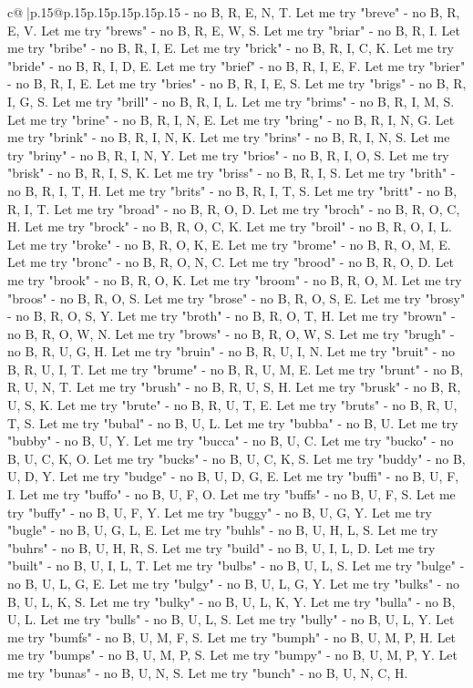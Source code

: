 \documentclass{article}
\begin{document}
{\begin{supertabular}{c@{$\;$}|p{.15\linewidth}@{}p{.15\linewidth}p{.15\linewidth}p{.15\linewidth}p{.15\linewidth}p{.15\linewidth}}
{{{{-} no B, R, E, N, T. Let me try "breve" {-} no B, R, E, V. Let me try "brews" {-} no B, R, E, W, S. Let me try "briar" {-} no B, R, I. Let me try "bribe" {-} no B, R, I, E. Let me try "brick" {-} no B, R, I, C, K. Let me try "bride" {-} no B, R, I, D, E. Let me try "brief" {-} no B, R, I, E, F. Let me try "brier" {-} no B, R, I, E. Let me try "bries" {-} no B, R, I, E, S. Let me try "brigs" {-} no B, R, I, G, S. Let me try "brill" {-} no B, R, I, L. Let me try "brims" {-} no B, R, I, M, S. Let me try "brine" {-} no B, R, I, N, E. Let me try "bring" {-} no B, R, I, N, G. Let me try "brink" {-} no B, R, I, N, K. Let me try "brins" {-} no B, R, I, N, S. Let me try "briny" {-} no B, R, I, N, Y. Let me try "brios" {-} no B, R, I, O, S. Let me try "brisk" {-} no B, R, I, S, K. Let me try "briss" {-} no B, R, I, S. Let me try "brith" {-} no B, R, I, T, H. Let me try "brits" {-} no B, R, I, T, S. Let me try "britt" {-} no B, R, I, T. Let me try "broad" {-} no B, R, O, D. Let me try "broch" {-} no B, R, O, C, H. Let me try "brock" {-} no B, R, O, C, K. Let me try "broil" {-} no B, R, O, I, L. Let me try "broke" {-} no B, R, O, K, E. Let me try "brome" {-} no B, R, O, M, E. Let me try "bronc" {-} no B, R, O, N, C. Let me try "brood" {-} no B, R, O, D. Let me try "brook" {-} no B, R, O, K. Let me try "broom" {-} no B, R, O, M. Let me try "broos" {-} no B, R, O, S. Let me try "brose" {-} no B, R, O, S, E. Let me try "brosy" {-} no B, R, O, S, Y. Let me try "broth" {-} no B, R, O, T, H. Let me try "brown" {-} no B, R, O, W, N. Let me try "brows" {-} no B, R, O, W, S. Let me try "brugh" {-} no B, R, U, G, H. Let me try "bruin" {-} no B, R, U, I, N. Let me try "bruit" {-} no B, R, U, I, T. Let me try "brume" {-} no B, R, U, M, E. Let me try "brunt" {-} no B, R, U, N, T. Let me try "brush" {-} no B, R, U, S, H. Let me try "brusk" {-} no B, R, U, S, K. Let me try "brute" {-} no B, R, U, T, E. Let me try "bruts" {-} no B, R, U, T, S. Let me try "bubal" {-} no B, U, L. Let me try "bubba" {-} no B, U. Let me try "bubby" {-} no B, U, Y. Let me try "bucca" {-} no B, U, C. Let me try "bucko" {-} no B, U, C, K, O. Let me try "bucks" {-} no B, U, C, K, S. Let me try "buddy" {-} no B, U, D, Y. Let me try "budge" {-} no B, U, D, G, E. Let me try "buffi" {-} no B, U, F, I. Let me try "buffo" {-} no B, U, F, O. Let me try "buffs" {-} no B, U, F, S. Let me try "buffy" {-} no B, U, F, Y. Let me try "buggy" {-} no B, U, G, Y. Let me try "bugle" {-} no B, U, G, L, E. Let me try "buhls" {-} no B, U, H, L, S. Let me try "buhrs" {-} no B, U, H, R, S. Let me try "build" {-} no B, U, I, L, D. Let me try "built" {-} no B, U, I, L, T. Let me try "bulbs" {-} no B, U, L, S. Let me try "bulge" {-} no B, U, L, G, E. Let me try "bulgy" {-} no B, U, L, G, Y. Let me try "bulks" {-} no B, U, L, K, S. Let me try "bulky" {-} no B, U, L, K, Y. Let me try "bulla" {-} no B, U, L. Let me try "bulls" {-} no B, U, L, S. Let me try "bully" {-} no B, U, L, Y. Let me try "bumfs" {-} no B, U, M, F, S. Let me try "bumph" {-} no B, U, M, P, H. Let me try "bumps" {-} no B, U, M, P, S. Let me try "bumpy" {-} no B, U, M, P, Y. Let me try "bunas" {-} no B, U, N, S. Let me try "bunch" {-} no B, U, N, C, H. }}}
\end{supertabular}}
\end{document}
